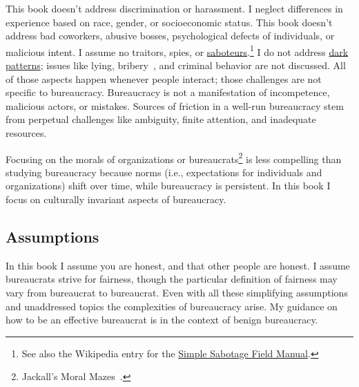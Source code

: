 This book doesn't address discrimination or harassment. I neglect differences in experience based on race, gender, or socioeconomic status. This book doesn't address bad coworkers, abusive bosses, psychological defects of individuals, or malicious intent. I assume no traitors, spies, \iftoggle{WPinmargin}{\marginpar{[Wikipedia] saboteurs}}{}
or \href{https://www.hsdl.org/?abstract&did=750070}{saboteurs}.\footnote{See also the Wikipedia entry for the \href{https://en.wikisource.org/wiki/Simple_Sabotage_Field_Manual}{Simple Sabotage Field Manual}.
}
I do not address \href{https://en.wikipedia.org/wiki/Dark_pattern}{dark patterns}; 
issues like lying, bribery~\cite{2021_Ang}, and criminal behavior are not discussed. All of those aspects happen whenever people interact; those challenges are not specific to bureaucracy. 
Bureaucracy is not a manifestation of incompetence, malicious actors, or mistakes. Sources of friction in a well-run bureaucracy stem from perpetual challenges like ambiguity, finite attention, and inadequate resources.

Focusing on the morals of organizations or bureaucrats\footnote{Jackall's Moral Mazes~\cite{2009_Jackall}.} is less compelling than studying bureaucracy because norms (i.e., expectations for individuals and organizations) shift over time, while bureaucracy is persistent. 
In this book I focus on culturally invariant aspects of bureaucracy. 


\subsection*{Assumptions}
In this book I assume you are honest, and that other people are honest.  
I assume bureaucrats strive for fairness, though the particular definition of fairness may vary from bureaucrat to bureaucrat. 
Even with all these simplifying assumptions and unaddressed topics the complexities of bureaucracy arise. My guidance on how to be an effective bureaucrat is in the context of benign bureaucracy.



